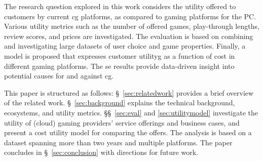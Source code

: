 
The research question explored in this work considers the
utility offered to customers by current \gls{cg}
platforms, as compared to gaming platforms for the \acrshort{PC}.
Various utility metrics such as the number of offered games,
play-through lengths, review scores, and prices are investigated.
The evaluation is based on combining and investigating large
datasets of user choice and game properties.
Finally, a model is proposed that expresses customer utilityg
as a function of cost in different gaming platforms.
The se results provide data-driven
insight into potential causes for and against \gls{cg}.

This paper is structured as follows: §~\ref{sec:relatedwork} provides a
brief overview of the related work. §~\ref{sec:background}
explains the technical background, ecosystems, and utility metrics.
§§~\ref{sec:eval} and \ref{sec:utilitymodel} investigate the utility of
(cloud) gaming providers' service offerings and business cases,
and present a cost utility model for comparing the offers.
The analysis is based on a dataset spanning more than two years and
multiple platforms.
The paper concludes in §~\ref{sec:conclusion} with
directions for future work.



